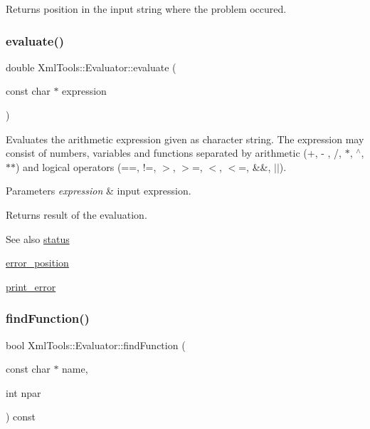 Returns position in the input string where the problem occured. \hypertarget{class_xml_tools_1_1_evaluator_a602611e00d06e6fa2b8c5a1b292c2747}{}\label{class_xml_tools_1_1_evaluator_a602611e00d06e6fa2b8c5a1b292c2747} 
\subsubsection{\texorpdfstring{evaluate()}{evaluate()}}
{\footnotesize\ttfamily double Xml\+Tools\+::\+Evaluator\+::evaluate (\begin{DoxyParamCaption}\item[{const char $\ast$}]{expression }\end{DoxyParamCaption})}

Evaluates the arithmetic expression given as character string. The expression may consist of numbers, variables and functions separated by arithmetic (+, -\/ , /, $\ast$, $^\wedge$, $\ast$$\ast$) and logical operators (==, !=, $>$, $>$=, $<$, $<$=, \&\&, $\vert$$\vert$).


\begin{DoxyParams}{Parameters}
{\em expression} & input expression. \\
\hline
\end{DoxyParams}
\begin{DoxyReturn}{Returns}
result of the evaluation. 
\end{DoxyReturn}
\begin{DoxySeeAlso}{See also}
\hyperlink{class_xml_tools_1_1_evaluator_af9265974643b0e1b1411ef5cea2b8580}{status} 

\hyperlink{class_xml_tools_1_1_evaluator_a2df5fb8050eeabce30ea87b8e211612a}{error\+\_\+position} 

\hyperlink{class_xml_tools_1_1_evaluator_a35b8445b51d7c045e4027aa55e1ddcae}{print\+\_\+error} 
\end{DoxySeeAlso}
\hypertarget{class_xml_tools_1_1_evaluator_a3c5918021a6c6954469d660738704f7e}{}\label{class_xml_tools_1_1_evaluator_a3c5918021a6c6954469d660738704f7e} 
\subsubsection{\texorpdfstring{find\+Function()}{findFunction()}}
{\footnotesize\ttfamily bool Xml\+Tools\+::\+Evaluator\+::find\+Function (\begin{DoxyParamCaption}\item[{const char $\ast$}]{name,  }\item[{int}]{npar }\end{DoxyParamCaption}) const}

